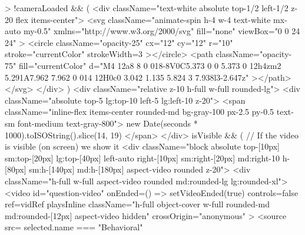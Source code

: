 {{{{                  >
                    {!cameraLoaded && (
                      <div className="text-white absolute top-1/2 left-1/2 z-20 flex items-center">
                        <svg
                          className="animate-spin h-4 w-4 text-white mx-auto my-0.5"
                          xmlns="http://www.w3.org/2000/svg"
                          fill="none"
                          viewBox="0 0 24 24"
                        >
                          <circle
                            className="opacity-25"
                            cx="12"
                            cy="12"
                            r="10"
                            stroke="currentColor"
                            strokeWidth={3}
                          ></circle>
                          <path
                            className="opacity-75"
                            fill="currentColor"
                            d="M4 12a8 8 0 018-8V0C5.373 0 0 5.373 0 12h4zm2 5.291A7.962 7.962 0 014 12H0c0 3.042 1.135 5.824 3 7.938l3-2.647z"
                          ></path>
                        </svg>
                      </div>
                    )}
                    <div className="relative z-10 h-full w-full rounded-lg">
                      <div className="absolute top-5 lg:top-10 left-5 lg:left-10 z-20">
                        <span className="inline-flex items-center rounded-md bg-gray-100 px-2.5 py-0.5 text-sm font-medium text-gray-800">
                          {new Date(seconds * 1000).toISOString().slice(14, 19)}
                        </span>
                      </div>
                      {isVisible && ( // If the video is visible (on screen) we show it
                        <div className="block absolute top-[10px] sm:top-[20px] lg:top-[40px] left-auto right-[10px] sm:right-[20px] md:right-10 h-[80px] sm:h-[140px] md:h-[180px] aspect-video rounded z-20">
                          <div className="h-full w-full aspect-video rounded md:rounded-lg lg:rounded-xl">
                            <video
                              id="question-video"
                              onEnded={() => setVideoEnded(true)}
                              controls={false}
                              ref={vidRef}
                              playsInline
                              className="h-full object-cover w-full rounded-md md:rounded-[12px] aspect-video hidden"
                              crossOrigin="anonymous"
                            >
                              <source
                                src={
                                  selected.name === "Behavioral"
}}}}}}
